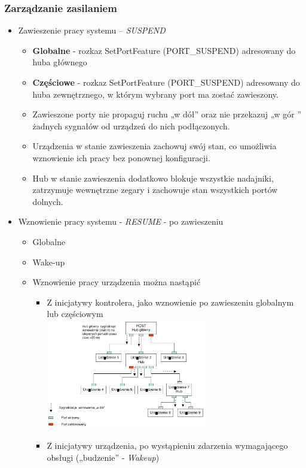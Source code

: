 	\subsubsection{Zarządzanie zasilaniem}
	\begin{itemize}
		\item Zawieszenie pracy systemu – \emph{SUSPEND}
		\begin{itemize}
			\item \textbf{Globalne} - rozkaz SetPortFeature (PORT\_SUSPEND) adresowany do huba głównego
			\item \textbf{Częściowe} - rozkaz SetPortFeature (PORT\_SUSPEND) adresowany do huba zewnętrznego, w którym wybrany port ma zostać zawieszony.
			\item Zawieszone porty nie propaguj ruchu „w dół” oraz nie przekazuj „w gór ” żadnych sygnałów od urządzeń do nich podłączonych.
			\item Urządzenia w stanie zawieszenia zachowuj swój stan, co umożliwia wznowienie ich pracy bez ponownej konfiguracji.
			\item Hub w stanie zawieszenia dodatkowo blokuje wszystkie nadajniki, zatrzymuje wewnętrzne zegary i zachowuje stan wszystkich portów dolnych.
		\end{itemize}
		\item Wznowienie pracy systemu - \emph{RESUME} - po zawieszeniu
		\begin{itemize}
			\item Globalne
			\item Wake-up
			\item Wznowienie pracy urządzenia można nastąpić
			\begin{itemize}
				\item Z inicjatywy kontrolera, jako wznowienie po zawieszeniu globalnym lub częściowym\\
				\includegraphics[width=7cm]{./wyklady/USB_43_1.pdf}
				\item Z inicjatywy urządzenia, po wystąpieniu zdarzenia wymagającego obsługi („budzenie” - \emph{Wakeup})\\

\end{itemize}
\end{itemize}
\end{itemize}
